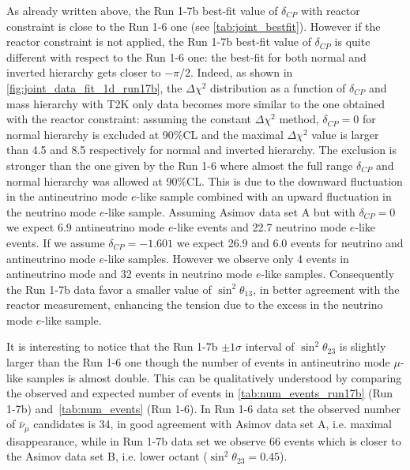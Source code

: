As already written above, the Run 1-7b best-fit value of $\delta_{CP}$ with reactor constraint is 
close to the Run 1-6 one (see \cref{tab:joint_bestfit}).
However if the reactor constraint is not applied, the Run 1-7b best-fit value of $\delta_{CP}$
is quite different with respect to the Run 1-6 one:
the best-fit for both normal and inverted hierarchy gets closer to $-\pi/2$.
Indeed, as shown in \cref{fig:joint_data_fit_1d_run17b}, 
the $\Delta \chi^2$ distribution as a function of $\delta_{CP}$ and mass hierarchy
with T2K only data becomes more similar to the one obtained with the reactor constraint:
assuming the constant $\Delta \chi^2$ method, $\delta_{CP}=0$ for normal hierarchy
is excluded at 90\%CL and the maximal $\Delta \chi^2$ value is 
larger than 4.5 and 8.5 respectively for normal and inverted hierarchy.
The exclusion is stronger than the one given by the Run 1-6 where
almost the full range $\delta_{CP}$ and normal hierarchy was allowed at 90\%CL.
This is due to the downward fluctuation in the antineutrino mode $e$-like sample
combined with an upward fluctuation in the neutrino mode $e$-like sample.
Assuming Asimov data set A but with $\delta_{CP} = 0$ we expect 6.9
antineutrino mode $e$-like events and 22.7 neutrino mode $e$-like events.
If we assume $\delta_{CP}=-1.601$ we expect 26.9 and 6.0 events 
for neutrino and antineutrino mode $e$-like samples.
However we observe only 4 events in antineutrino mode and 
32 events in neutrino mode $e$-like samples.
Consequently the Run 1-7b data favor a smaller value of $\sin^2 \theta_{13}$,
in better agreement with the reactor measurement,
enhancing the tension due to the excess in the neutrino mode $e$-like sample.

It is interesting to notice that the Run 1-7b $\pm 1\sigma$ interval of $\sin^2 \theta_{23}$ is slightly larger
than the Run 1-6 one though the number of events in antineutrino mode $\mu$-like samples is almost double. 
This can be qualitatively understood by comparing the observed and expected number of events
in \cref{tab:num_events_run17b} (Run 1-7b) and~\ref{tab:num_events} (Run 1-6).
In Run 1-6 data set the observed number of $\bar{\nu}_{\mu}$ candidates is 34, in good agreement
with Asimov data set A, i.e. maximal disappearance, while in Run 1-7b data set we observe 66 events
which is closer to the Asimov data set B, i.e. lower octant ($\sin^2 \theta_{23} = 0.45$).


